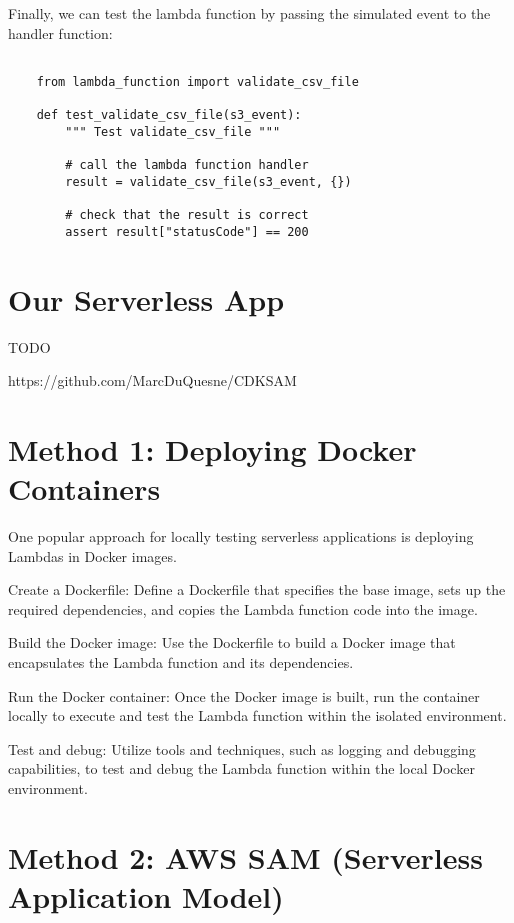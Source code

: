 \documentclass{article}
\begin{document}
Finally, we can test the lambda function by passing the simulated event to the handler function:

\begin{verbatim}

    from lambda_function import validate_csv_file

    def test_validate_csv_file(s3_event):
        """ Test validate_csv_file """

        # call the lambda function handler
        result = validate_csv_file(s3_event, {})

        # check that the result is correct
        assert result["statusCode"] == 200

\end{verbatim}



\section{Our Serverless App}

TODO

https://github.com/MarcDuQuesne/CDKSAM

\section{Method 1: Deploying Docker Containers}

One popular approach for locally testing serverless applications is deploying Lambdas in Docker images.

Create a Dockerfile: Define a Dockerfile that specifies the base image, sets up the required dependencies, and copies the Lambda function code into the image.

Build the Docker image: Use the Dockerfile to build a Docker image that encapsulates the Lambda function and its dependencies.

Run the Docker container: Once the Docker image is built, run the container locally to execute and test the Lambda function within the isolated environment.

Test and debug: Utilize tools and techniques, such as logging and debugging capabilities, to test and debug the Lambda function within the local Docker environment.


\section{Method 2: AWS SAM (Serverless Application Model)}
\end{document}
